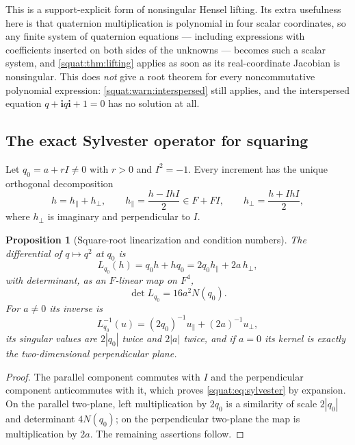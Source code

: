 \documentclass[11pt,letterpaper]{article}
\numberwithin{equation}{section}
\newtheorem{proposition}[proposition]{Proposition}
\theoremstyle{definition}
\theoremstyle{remark}
\newcommand{\ii}{\mathbf i}
\newcommand{\abs}[1]{\left|#1\right|}
\begin{document}
This is a support-explicit form of nonsingular Hensel lifting. Its extra usefulness here is
that quaternion multiplication is polynomial in four scalar coordinates, so any finite
system of quaternion equations --- including expressions with coefficients inserted on both
sides of the unknowns --- becomes such a scalar system, and
\cref{squat:thm:lifting} applies as soon as its real-coordinate Jacobian is nonsingular.
This does \emph{not} give a root theorem for every noncommutative polynomial expression:
\cref{squat:warn:interspersed} still applies, and the interspersed equation
$q+\ii q\ii+1=0$ has no solution at all.

\subsection{The exact Sylvester operator for squaring}\label{squat:sub:sylvester}
Let $q_0=a+rI\ne0$ with $r>0$ and $I^2=-1$. Every increment has the unique orthogonal
decomposition
\[
 h=h_{\parallel}+h_{\perp},\qquad
 h_{\parallel}=\frac{h-IhI}{2}\in F+FI,\qquad
 h_{\perp}=\frac{h+IhI}{2},
\]
where $h_\perp$ is imaginary and perpendicular to $I$.

\begin{proposition}[Square-root linearization and condition numbers]\label{squat:prop:sylvester}
The differential of $q\mapsto q^2$ at $q_0$ is
\begin{equation}\label{squat:eq:sylvester}
 L_{q_0}(h)=q_0h+hq_0=2q_0h_{\parallel}+2a\,h_{\perp},
\end{equation}
with determinant, as an $F$-linear map on $F^4$,
\[
 \det L_{q_0}=16a^2N(q_0).
\]
For $a\ne0$ its inverse is
\begin{equation}\label{squat:eq:sylvester-inverse}
 L_{q_0}^{-1}(u)=(2q_0)^{-1}u_{\parallel}+(2a)^{-1}u_{\perp},
\end{equation}
its singular values are $2\abs{q_0}$ twice and $2\abs a$ twice, and if $a=0$ its kernel is
exactly the two-dimensional perpendicular plane.
\end{proposition}
\begin{proof}
The parallel component commutes with $I$ and the perpendicular component anticommutes with
it, which proves \cref{squat:eq:sylvester} by expansion. On the parallel two-plane, left
multiplication by $2q_0$ is a similarity of scale $2\abs{q_0}$ and determinant $4N(q_0)$;
on the perpendicular two-plane the map is multiplication by $2a$. The remaining assertions
follow.
\end{proof}
\end{document}
